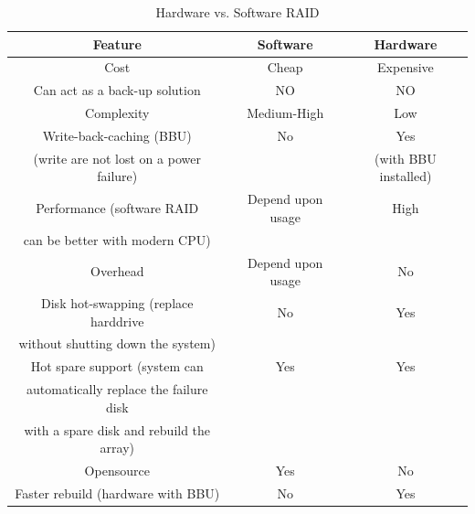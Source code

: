 \begin{table}[hbt]
\begin{center}
\caption{Hardware vs. Software RAID}
\begin{tabular}{ c |c|c} 
  \hline
Feature	 & Software & Hardware \\ 
  \hline\hline
Cost & Cheap & Expensive	\\
Can act as a back-up solution & NO & NO \\
Complexity & Medium-High & Low \\
Write-back-caching (BBU)   & No & Yes  \\
(write are not lost on
a power failure)  & & (with BBU installed) \\
  Performance (software RAID  & Depend upon usage
  & High
  \\
  can be better with modern CPU) & & \\
  Overhead & Depend upon usage & No \\
  Disk hot-swapping (replace harddrive  & No &
  Yes \\
  without shutting down the system) & & \\
  Hot spare support (system can  & Yes & Yes \\
  automatically replace the failure disk  & & \\
  with a
  spare disk and rebuild the array) & & \\
  Opensource & Yes & No \\
  Faster rebuild (hardware with BBU) & No & Yes \\
\end{tabular}
\end{center}
\label{tab:RAID}
\end{table}

